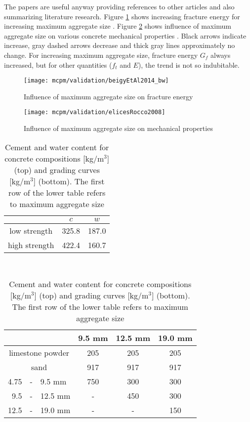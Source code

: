 The papers are useful anyway providing references to other articles and also summarizing literature research.
Figure \ref{figMCPMValidationFracEnergyOnMaxAggregSize} shows increasing fracture energy for increasing maximum aggregate size \cite{BeygiEtAl2014b}.
Figure \ref{figMCPMValidationMaxAggregSizeInfluenceElicesRocco} shows influence of maximum aggregate size on various concrete mechanical properties \cite{ElicesRocco2008a}.
Black arrows indicate increase, gray dashed arrows decrease and thick gray lines approximately no change.
For increasing maximum aggregate size, fracture energy $G_f$ always increased, but for other quantities ($f_t$ and $E$), the trend is not so indubitable.

\begin{figure}[htbp]
	\centering
	\texttt{[image: mcpm/validation/beigyEtAl2014\_bw]}
	\caption[Influence of maximum aggregate size on fracture energy]{Influence of maximum aggregate size on fracture energy \cite{BeygiEtAl2014b}}
	\label{figMCPMValidationFracEnergyOnMaxAggregSize}
\end{figure}

\begin{figure}[htbp]
	\centering
	\texttt{[image: mcpm/validation/elicesRocco2008]}
	\caption[Influence of maximum aggregate size on mechanical properties]{Influence of maximum aggregate size on mechanical properties \cite{ElicesRocco2008a}}
	\label{figMCPMValidationMaxAggregSizeInfluenceElicesRocco}
\end{figure}



\begin{table}[htbp]
	\centering
	\caption[Concrete compositions]{Cement and water content for concrete compositions [kg/m$^3$] (top) and grading curves [kg/m$^3$] (bottom). The first row of the lower table refers to maximum aggregate size}
	\begin{tabular}{|c|c|c|}
		\hline
		 & $c$ & $w$ \\
		\hline\hline
		low strength  & 325{.}8 & 187{.}0 \\
		\hline
		high strength & 422{.}4 & 160{.}7 \\
		\hline
	\end{tabular}
	\\
	\vspace{1em}
	\begin{tabular}{|rcl|c|c|c|}
		\hline
		     &   &         & 9{.}5 mm & 12{.}5 mm & 19{.}0 mm \\
		\hline\hline
		\multicolumn{3}{|c|}{limestone powder} & 205 & 205 & 205 \\
		\hline
		\multicolumn{3}{|c|}{sand} & 917 & 917 & 917 \\
		\hline
		4.75 & - & 9.5 mm  & 750      & 300       & 300 \\
		\hline
		9.5  & - & 12.5 mm &  -       & 450       & 300 \\
		\hline
		12.5 & - & 19.0 mm &  -       &  -        & 150 \\
		\hline
	\end{tabular}
	\label{tabMCPMValidationBeygiExperiment}
\end{table}

